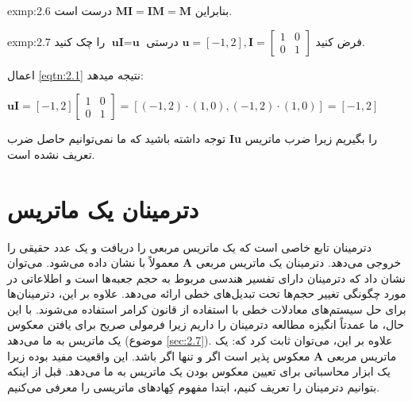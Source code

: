 {\begin{spacing}{1.5}
\begin{exmp}{exmp:2.6}
            بنابراین $\textbf{MI}=\textbf{IM}=\textbf{M}$ درست است.
        \end{exmp}

        \begin{exmp}{exmp:2.7}
            \Large
            فرض کنید
            $\textbf{u}=[-1,2], \textbf{I}=\begin{bmatrix}
                                               1 & 0 \\
                                               0 & 1
            \end{bmatrix}$
            درستی $\textbf{uI}=\textbf{u}$ را چک کنید.

            اعمال \ref{eqtn:2.1} نتیجه میدهد:

            $\textbf{uI}=[-1,2]\begin{bmatrix}
                                   1 & 0 \\
                                   0 & 1
            \end{bmatrix}=\left[ (-1,2)\cdot(1,0), (-1,2)\cdot(1,0) \right]=[-1, 2]$

            توجه داشته باشید که ما نمی‌توانیم حاصل ضرب \textbf{Iu} را بگیریم زیرا ضرب ماتریس تعریف نشده است.
        \end{exmp}
    \end{spacing}
}


\section{\textbf{دترمینان یک ماتریس}}
\label{sec:2.5}
{
    \Large
    \begin{spacing}{1.3}
        دترمینان تابع خاصی است که یک ماتریس مربعی را دریافت و یک عدد حقیقی را خروجی می‌دهد.
        دترمینان یک ماتریس مربعی $\textbf{A}$ معمولاً با  نشان داده می‌شود.
        می‌توان نشان داد که دترمینان دارای تفسیر هندسی مربوط به حجم جعبه‌ها است و اطلاعاتی در مورد چگونگی تغییر حجم‌ها تحت تبدیل‌های خطی ارائه می‌دهد.
        علاوه بر این، دترمینان‌ها برای حل سیستم‌های معادلات خطی با استفاده از قانون کرامر استفاده می‌شوند.
        با این حال، ما عمدتاً انگیزه مطالعه دترمینان را داریم زیرا فرمولی صریح برای یافتن معکوس یک ماتریس به ما می‌دهد (موضوع \ref{sec:2.7}).
        علاوه بر این، می‌توان ثابت کرد که: یک ماتریس مربعی $\textbf{A}$ معکوس پذیر است اگر و تنها اگر  باشد.
        این واقعیت مفید بوده زیرا یک ابزار محاسباتی برای تعیین معکوس بودن یک ماتریس به ما می‌دهد.
        قبل از اینکه بتوانیم دترمینان را تعریف کنیم، ابتدا مفهوم کِهادهای ماتریسی را معرفی می‌کنیم.
    \end{spacing}
}

